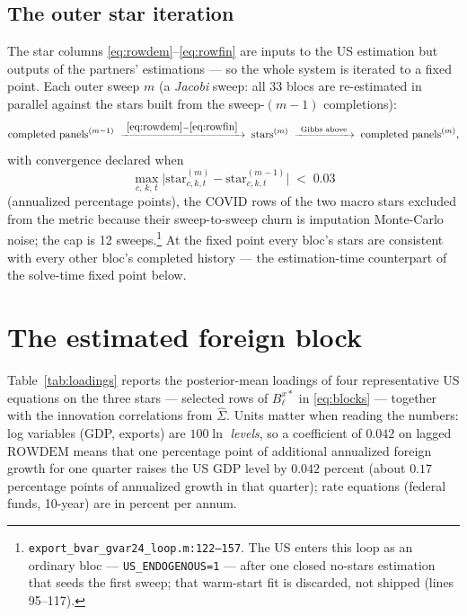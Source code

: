 \documentclass[11pt]{article}
\newcommand{\code}[1]{\texttt{\small #1}}
\begin{document}
\subsection{The outer star iteration}\label{sec:emloop}

The star columns \eqref{eq:rowdem}--\eqref{eq:rowfin} are inputs to the US estimation but outputs
of the partners' estimations --- so the whole system is iterated to a fixed point. Each outer
sweep $m$ (a \emph{Jacobi} sweep: all 33 blocs are re-estimated in parallel against the stars
built from the sweep-$(m-1)$ completions):
\[
  \text{completed panels}^{(m-1)}
  \;\xrightarrow{\ \eqref{eq:rowdem}-\eqref{eq:rowfin}\ }\;
  \text{stars}^{(m)}
  \;\xrightarrow{\ \text{Gibbs above}\ }\;
  \text{completed panels}^{(m)},
\]
with convergence declared when
\begin{equation}\label{eq:emtol}
  \max_{c,\,k,\,t} \big| \mathrm{star}^{(m)}_{c,k,t} - \mathrm{star}^{(m-1)}_{c,k,t} \big| \;<\; 0.03
\end{equation}
(annualized percentage points), the COVID rows of the two macro stars excluded from the metric
because their sweep-to-sweep churn is imputation Monte-Carlo noise; the cap is 12
sweeps.\footnote{\code{export\_bvar\_gvar24\_loop.m:122--157}. The US enters this loop as an
ordinary bloc --- \code{US\_ENDOGENOUS=1} --- after one closed no-stars estimation that seeds the
first sweep; that warm-start fit is discarded, not shipped (lines 95--117).} At the fixed point
every bloc's stars are consistent with every other bloc's completed history --- the estimation-time
counterpart of the solve-time fixed point below.

\section{The estimated foreign block}\label{sec:loadings}

Table~\ref{tab:loadings} reports the posterior-mean loadings of four representative US equations
on the three stars --- selected rows of $B^{x*}_\ell$ in \eqref{eq:blocks} --- together with the
innovation correlations from $\hat\Sigma$. Units matter when reading the numbers: log variables
(GDP, exports) are $100\ln$ \emph{levels}, so a coefficient of $0.042$ on lagged
$\mathrm{ROWDEM}$ means that one percentage point of additional annualized foreign growth for one
quarter raises the US GDP level by $0.042$ percent (about $0.17$ percentage points of annualized
growth in that quarter); rate equations (federal funds, 10-year) are in percent per annum.
\end{document}

